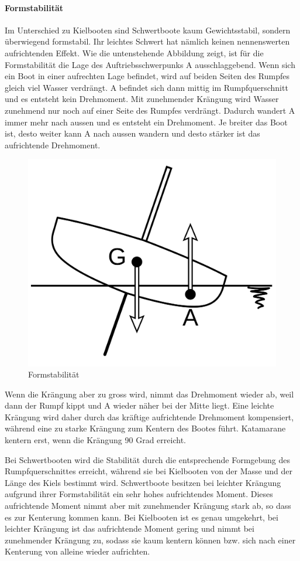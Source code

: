 \paragraph{Formstabilität}
Im Unterschied zu Kielbooten sind Schwertboote kaum Gewichtsstabil, sondern überwiegend formstabil. Ihr leichtes Schwert hat nämlich keinen nennenswerten aufrichtenden Effekt. Wie die untenstehende Abbildung zeigt, ist für die Formstabilität die Lage des Auftriebsschwerpunks A ausschlaggebend. Wenn sich ein Boot in einer aufrechten Lage befindet, wird auf beiden Seiten des Rumpfes gleich viel Wasser verdrängt. A befindet sich dann mittig im Rumpfquerschnitt und es entsteht kein Drehmoment. Mit zunehmender Krängung wird Wasser zunehmend nur noch auf einer Seite des Rumpfes verdrängt. Dadurch wandert A immer mehr nach aussen und es entsteht ein Drehmoment. Je breiter das Boot ist, desto weiter kann A nach aussen wandern und desto stärker ist das aufrichtende Drehmoment. 
\begin{figure}[H]
    \centering
    \includegraphics[width=0.5\linewidth]{Segeln_Formstabilitaet.svg.png}
    \caption{Formstabilität }
    \label{fig:enter-label}
\end{figure}
Wenn die Krängung aber zu gross wird, nimmt das Drehmoment wieder ab, weil dann der Rumpf kippt und A wieder näher bei der Mitte liegt. Eine leichte Krängung wird daher durch das kräftige aufrichtende Drehmoment kompensiert, während eine zu starke Krängung zum Kentern des Bootes führt. Katamarane kentern erst, wenn die Krängung 90 Grad erreicht. 

Bei Schwertbooten wird die Stabilität durch die entsprechende Formgebung des Rumpfquerschnittes erreicht, während sie bei Kielbooten von der Masse und der Länge des Kiels bestimmt wird. Schwertboote besitzen bei leichter Krängung aufgrund ihrer Formstabilität ein sehr hohes aufrichtendes Moment. Dieses aufrichtende Moment nimmt aber mit zunehmender Krängung stark ab, so dass es zur Kenterung kommen kann. Bei Kielbooten ist es genau umgekehrt, bei leichter Krängung ist das aufrichtende Moment gering und nimmt bei zunehmender Krängung zu, sodass sie kaum kentern können bzw. sich nach einer Kenterung von alleine wieder aufrichten. 
\cite{noauthor_schwertboot_2023}
